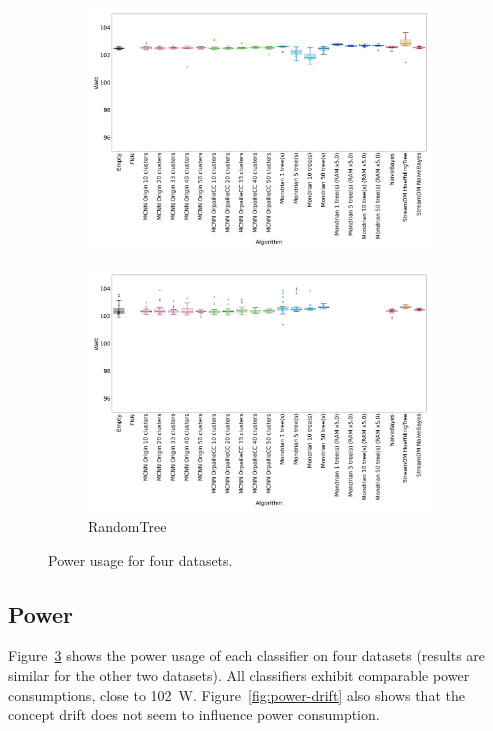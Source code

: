 \begin{figure}
\begin{subfigure}[t]{.49\linewidth}
		\includegraphics[width=\linewidth]{figures/results/recofit_6_watt.png}
		\caption{\recofitdataset}
		\label{fig:power-recofit}
	\end{subfigure}
	\hfill
	\begin{subfigure}[t]{.49\linewidth}
		\includegraphics[width=\linewidth]{figures/results/dataset_3_watt.png}
		\caption{RandomTree}
		\label{fig:power-dataset_3}
	\end{subfigure}
	\caption{Power usage for four datasets.}
	\label{fig:power}
\end{figure}
\subsection{Power}
\label{sec:result-power}
Figure~\ref{fig:power} shows the power usage of each classifier on four
datasets (results are similar for the other two datasets). All classifiers exhibit comparable power consumptions, close to
102~W. Figure~\ref{fig:power-drift} also
shows that the concept drift does not seem to influence power consumption.

